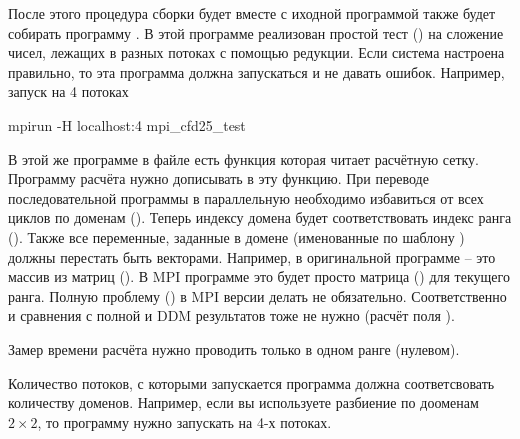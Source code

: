 После этого процедура сборки будет вместе с иходной программой  также будет собирать программу .
В этой программе реализован простой тест () на сложение чисел, лежащих в разных потоках с помощью редукции.
Если система настроена правильно, то эта программа должна запускаться и не давать ошибок. Например, запуск на 4 потоках
\begin{bashcode}
mpirun -H localhost:4 mpi_cfd25_test 
\end{bashcode}

В этой же программе в файле  есть функция 
которая читает расчётную сетку. Программу расчёта нужно дописывать в эту функцию.
При переводе последовательной программы в параллельную необходимо
избавиться от всех циклов по доменам (). Теперь индексу домена будет соответствовать индекс ранга ().
Также все переменные, заданные в домене (именованные по шаблону )
должны перестать быть векторами. Например,  в оригинальной программе -- это массив из матриц ().
В MPI программе это будет просто матрица () для текущего ранга.
Полную проблему () в MPI версии делать не обязательно.
Соответственно и сравнения с полной и DDM результатов тоже не нужно (расчёт поля ).

Замер времени расчёта нужно проводить только в одном ранге (нулевом).

Количество потоков, с которыми запускается программа должна соответсвовать количеству доменов.
Например, если вы используете разбиение по дооменам $2\times2$, то программу нужно запускать на 4-х потоках.
